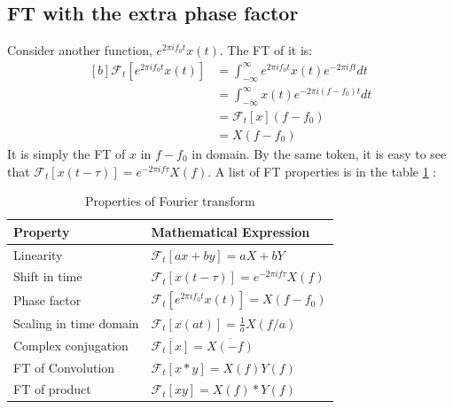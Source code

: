 \documentclass[letterpaper, 11pt]{article}
\newcommand{\fint}{\int_{-\infty}^{\infty}} %
\newcommand{\fourier}[2]{\mathcal{F}_{#1}[#2]} %
\newcommand{\ft}[3]{\fint #2 e^{-2\pi i#3#1} d#1} %
\numberwithin{equation}{section}
\numberwithin{figure}{section}
\numberwithin{table}{section}
\begin{document}
\subsection{FT with the extra phase factor}
Consider another function, \(e^{2\pi i f_{0} t}x(t)\). The FT of it is:
\begin{equation}
	\begin{aligned}[b]
		\fourier{t}{e^{2\pi i f_{0} t}x(t)}
			&= \ft{t}{e^{2\pi i f_{0} t}x(t)}{f}\\
			&= \ft{t}{x(t)}{(f - f_{0})}\\
			&= \fourier{t}{x}(f - f_{0})\\
			&= X(f - f_{0})
	\end{aligned}
\end{equation}
It is simply the FT of \(x\) in \(f - f_{0}\) in domain. By the same token, it is easy to see that \(\fourier{t}{x(t - \tau)} = e^{-2\pi i f\tau}X(f)\). A list of FT properties is in the table \ref{tab:ft} \cite{arfken}:
\begin{table}
	\centering
	\caption[optional argument]{Properties of Fourier transform}
	\begin{tabular}{|l|l|}
		\hline
		Property		& Mathematical Expression\\
		\hline
		Linearity		& \(\fourier{t}{ax + by} = aX + bY\) \\
		\hline
		Shift in time		& \(\fourier{t}{x(t -\tau)} = e^{-2\pi if\tau}X(f)\)\\
		\hline
		Phase factor		& \(\fourier{t}{e^{2\pi i f_{0} t}x(t)} = X(f - f_{0})\)\\
		\hline
		Scaling in time domain	& \(\fourier{t}{x(at)} = \frac{1}{a}X(f/a)\)\\
		\hline
		Complex conjugation	& \(\overline{\fourier{t}{x}} = \overline{X(-f)}\) \\
		\hline
		FT of Convolution	& \(\fourier{t}{x*y} = X(f)Y(f) \)\\
		\hline
		FT of product		& \(\fourier{t}{xy} = X(f)*Y(f) \)\\
		\hline
	\end{tabular}
	\label{tab:ft}
\end{table}

\end{document}
